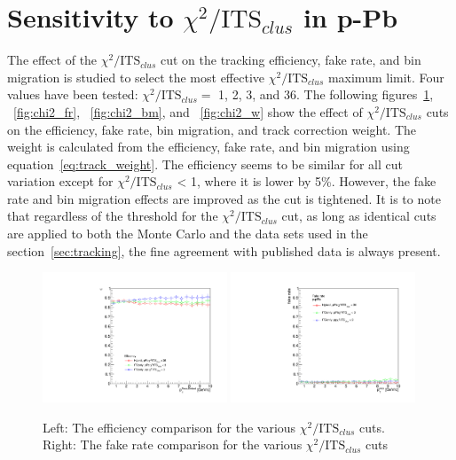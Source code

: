 \section{Sensitivity to $\chi^2/\mathrm{ITS}_{clus}$ in p-Pb}
The effect of the $\chi^2/\mathrm{ITS}_{clus}$ cut on the tracking efficiency, fake rate, and bin migration is studied to select the most effective $\chi^2/\mathrm{ITS}_{clus}$ maximum limit. Four values have been tested: $\chi^2/\mathrm{ITS}_{clus} =$ 1, 2, 3, and 36. The following figures~\ref{fig:chi2_eff}, ~\ref{fig:chi2_fr}, ~\ref{fig:chi2_bm}, and ~\ref{fig:chi2_w} show the effect of $\chi^2/\mathrm{ITS}_{clus}$ cuts on the efficiency, fake rate, bin migration, and track correction weight. The weight is calculated from the efficiency, fake rate, and bin migration using equation~\ref{eq:track_weight}. The efficiency seems to be similar for all cut variation except for $\chi^2/\mathrm{ITS}_{clus}$ < 1, where it is lower by 5\%. However, the fake rate and bin migration effects are improved as the cut is tightened. It is to note that regardless of the threshold for the $\chi^2/\mathrm{ITS}_{clus}$ cut, as long as identical cuts are applied to both the Monte Carlo and the data sets used in the section~\ref{sec:tracking}, the fine agreement with published data is always present.

\begin{figure}[h]
    \centering
    \includegraphics[width=0.49\textwidth]{Checks_Systematics/ITSchi2_study_efficiency.pdf}
        \includegraphics[width=0.49\textwidth]{Checks_Systematics/ITSchi2_study_fakerate.pdf}
    \caption{Left: The efficiency comparison for the various $\chi^2/\mathrm{ITS}_{clus}$ cuts. Right: The fake rate comparison for the various $\chi^2/\mathrm{ITS}_{clus}$ cuts}
    \label{fig:chi2_eff}
\end{figure}

